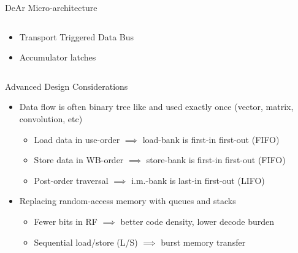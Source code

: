\documentclass{beamer}
\begin{document}
\begin{CJK}{UTF8}{bkai}
\begin{frame}{DeAr Micro-architecture}
\begin{columns}
\begin{column}{0.35\textwidth}
\begin{block}
\begin{itemize}
{\begin{itemize}
                                    \end{itemize}
                                }
                                \item <4->{Transport Triggered Data Bus}
                                \item <5->{Accumulator latches}
                            \end{itemize}    
                        \end{block}
                    \end{column}
                \end{columns}
            \end{frame}

            \begin{frame}{Advanced Design Considerations}
                \begin{itemize}
                    \item Data flow is often binary tree like and used exactly once (vector, matrix, convolution, etc)
                        \begin{itemize}
                            \item Load data in use-order $\implies$ load-bank is first-in first-out (FIFO)
                            \item Store data in WB-order $\implies$ store-bank is first-in first-out (FIFO)
                            \item Post-order traversal $\implies$ i.m.-bank is last-in first-out (LIFO)
                        \end{itemize}
                    \item Replacing random-access memory with queues and stacks
                        \begin{itemize}
                            \item Fewer bits in RF $\implies$ better code density, lower decode burden
                            \item Sequential load/store (L/S) $\implies$ burst memory transfer
                        \end{itemize}
                \end{itemize}
                \centering
                {
                }
            \end{frame}


\end{CJK}
\end{document}
